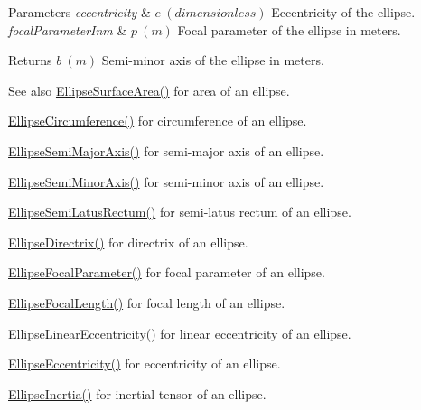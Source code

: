 \begin{DoxyParams}{Parameters}
{\em eccentricity} & $ e\ (dimensionless)$ Eccentricity of the ellipse. \\
\hline
{\em focal\+Parameter\+Inm} & $ p\ (m)$ Focal parameter of the ellipse in meters. \\
\hline
\end{DoxyParams}
\begin{DoxyReturn}{Returns}
$ b\ (m)$ Semi-\/minor axis of the ellipse in meters. 
\end{DoxyReturn}
\begin{DoxySeeAlso}{See also}
\mbox{\hyperlink{group___e_g_x_math-_geometry-2_d-_ellipse-_surface_area_ga4ce8c8323e9718ce5458f4ab7f6d823d}{Ellipse\+Surface\+Area()}} for area of an ellipse. 

\mbox{\hyperlink{group___e_g_x_math-_geometry-2_d-_ellipse-_circumference_ga4172802ac674eb53467b44928ac635c7}{Ellipse\+Circumference()}} for circumference of an ellipse. 

\mbox{\hyperlink{group___e_g_x_math-_geometry-2_d-_ellipse-_semi_major_axis_ga646a2ca065f4ac3f666a9ea22f3bb527}{Ellipse\+Semi\+Major\+Axis()}} for semi-\/major axis of an ellipse. 

\mbox{\hyperlink{group___e_g_x_math-_geometry-2_d-_ellipse-_semi_minor_axis_gae461acf3333565d69527dd86e9aa2b32}{Ellipse\+Semi\+Minor\+Axis()}} for semi-\/minor axis of an ellipse. 

\mbox{\hyperlink{group___e_g_x_math-_geometry-2_d-_ellipse-_semi_latus_rectum_gacfd1844eb4ef3d1ee3c0b460a6442ae6}{Ellipse\+Semi\+Latus\+Rectum()}} for semi-\/latus rectum of an ellipse. 

\mbox{\hyperlink{group___e_g_x_math-_geometry-2_d-_ellipse-_directrix_gace8f72a8efbc9c18d3eb689151405106}{Ellipse\+Directrix()}} for directrix of an ellipse. 

\mbox{\hyperlink{group___e_g_x_math-_geometry-2_d-_ellipse-_focal_parameter_ga4cd01a38c72c092ef9791351948bf69b}{Ellipse\+Focal\+Parameter()}} for focal parameter of an ellipse. 

\mbox{\hyperlink{group___e_g_x_math-_geometry-2_d-_ellipse-_focal_length_gab8d63de7640c880cfecaeada6f2afdac}{Ellipse\+Focal\+Length()}} for focal length of an ellipse. 

\mbox{\hyperlink{group___e_g_x_math-_geometry-2_d-_ellipse-_linear_eccentricity_gac70b3010e30aa8b73deb50fe2b9b9a91}{Ellipse\+Linear\+Eccentricity()}} for linear eccentricity of an ellipse. 

\mbox{\hyperlink{group___e_g_x_math-_geometry-2_d-_ellipse-_eccentricity_ga6a0a7fba17f782616894cfc447628c33}{Ellipse\+Eccentricity()}} for eccentricity of an ellipse. 

\mbox{\hyperlink{group___e_g_x_math-_geometry-2_d-_ellipse-_inertia_ga10a3049c2f04b50f271fb01dc62e4cf8}{Ellipse\+Inertia()}} for inertial tensor of an ellipse. 
\end{DoxySeeAlso}
